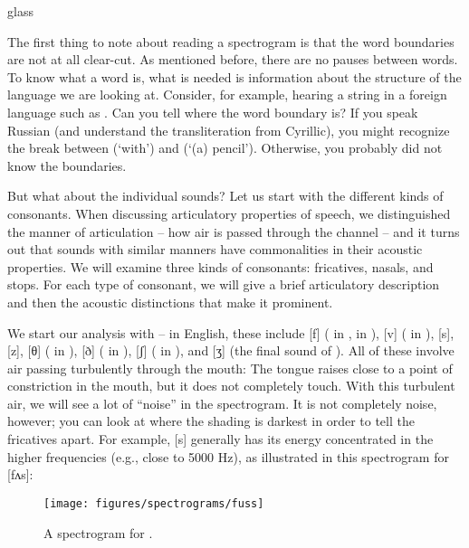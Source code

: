 \begin{tblsfilledsymbol}{}{glass}
\begin{underthehood}
The first thing to note about reading a spectrogram is that the word
boundaries are not at all clear-cut.  As mentioned before, there are
no pauses between words.  To know what a word is, what is needed is
information about the structure of the language we are looking at.
Consider, for example, hearing a string in a foreign language such as
.  Can you tell where the word boundary is?  If
you speak Russian (and understand the transliteration from Cyrillic),
you might recognize the break between  (`with') and
 (`(a) pencil').  Otherwise, you probably did not
know the boundaries.

But what about the individual sounds?  Let us start with the different
kinds of consonants.  When discussing articulatory properties of
speech, we distinguished the manner of articulation -- how air is
passed through the channel -- and it turns out that sounds with similar
manners have commonalities in their acoustic properties.  We will
examine three kinds of consonants: fricatives, nasals, and stops.
For each type of consonant, we will give a brief articulatory
description and then the acoustic distinctions that make it prominent.

We start our analysis with  -- in English, these include
{[f]} ( in ,  in ), {[v]} ( in ), {[s]}, {[z]},
[θ] ( in ), [ð]
( in ), [ʃ] ( in
), and [ʒ] (the final sound of ).
All of these involve air passing turbulently through the mouth: The
tongue raises close to a point of constriction in the mouth, but it
does not completely touch.  With this turbulent air, we will see a lot
of ``noise'' in the spectrogram.
It is not completely noise, however; you can look at where the shading
is darkest in order to tell the fricatives apart.  For example, {[s]} generally has its energy
concentrated in the higher frequencies (e.g., close to 5000 Hz), as
illustrated in this spectrogram for  [fʌs]:

\begin{figure}[H]
\texttt{[image: figures/spectrograms/fuss]}
\caption{A spectrogram for .}
\label{fig:fuss}
\end{figure}



\end{underthehood}
\end{tblsfilledsymbol}
